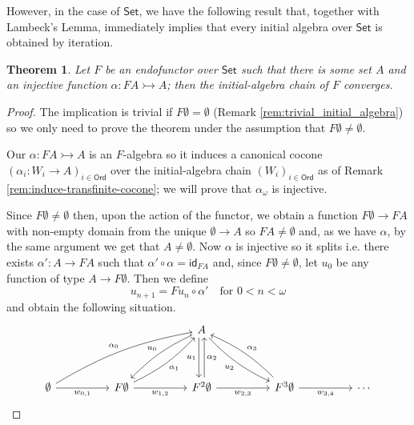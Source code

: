 \documentclass[letterpaper, 11pt, oneside]{memoir}
\theoremstyle{myteo}
\newtheorem{theorem}{Theorem}[section]
\numberwithin{equation}{section}
\newcommand{\id}{\textsf{id}}
\newcommand{\Ord}{\textsf{Ord}}
\newcommand{\Set}{\textsf{Set}}
\begin{document}
However, in the case of \(\Set\), we have the following result that, together with Lambeck's Lemma, immediately implies that every initial algebra over \(\Set\) is obtained by iteration.

\begin{theorem}
  \label{teo:set_lambeck_converse}
  Let \(F\) be an endofunctor over \(\Set\) such that there is some set \(A\) and an injective function \(\alpha : FA \rightarrowtail A\); then the initial-algebra chain of \(F\) converges.
\end{theorem}

\begin{proof}
  The implication is trivial if \(F\emptyset = \emptyset\) (Remark \ref{rem:trivial_initial_algebra}) so we only need to prove the theorem under the assumption that \(F\emptyset \neq \emptyset\).

  Our \(\alpha : FA \rightarrowtail A\) is an \(F\)-algebra so it induces a canonical cocone \((\alpha_i:W_i \to A)_{i \in \Ord}\) over the initial-algebra chain \((W_i)_{i \in \Ord}\) as of Remark \ref{rem:induce-transfinite-cocone}; we will prove that \(\alpha_\omega\) is injective.
  
  Since \(F\emptyset \neq \emptyset\) then, upon the action of the functor, we obtain a function \(F\emptyset \to FA\) with non-empty domain from the unique \(\emptyset \to A\) so \(FA \neq \emptyset\) and, as we have \(\alpha\), by the same argument we get that \(A \neq \emptyset\).
  Now \(\alpha\) is injective so it splits i.e. there exists \(\alpha': A \to FA\) such that \(\alpha' \circ \alpha = \id_{FA}\) and, since \(F\emptyset \neq \emptyset\), let \(u_0\) be any function of type \(A \to F\emptyset\).
  Then we define
  \begin{equation*}
    u_{n+1} = Fu_n \circ \alpha' \quad \text{for \(0 < n < \omega\)}
  \end{equation*}
  and obtain the following situation.
  \begin{equation*}
    \begin{tikzcd}[sep=huge]
      & & A \ar[dl, bend right=10, "u_0"'] \ar[d, shift right=1, "u_1"'] \ar[dr, bend right=10, "u_2"'] & &\\
      \emptyset \ar[urr, bend left=10, "\alpha_0"] \ar[r, "w_{0,1}"'] & F\emptyset \ar[r, "w_{1,2}"'] \ar[ru, bend right=10, "\alpha_1"'] & F^2\emptyset \ar[r, "w_{2, 3}"'] \ar[u, shift right=1, "\alpha_2"'] & F^3\emptyset \ar[r, "w_{3, 4}"'] \ar[lu, bend right=10, "\alpha_3"'] & \cdots
    \end{tikzcd}
  \end{equation*}
  

\end{proof}
\end{document}
